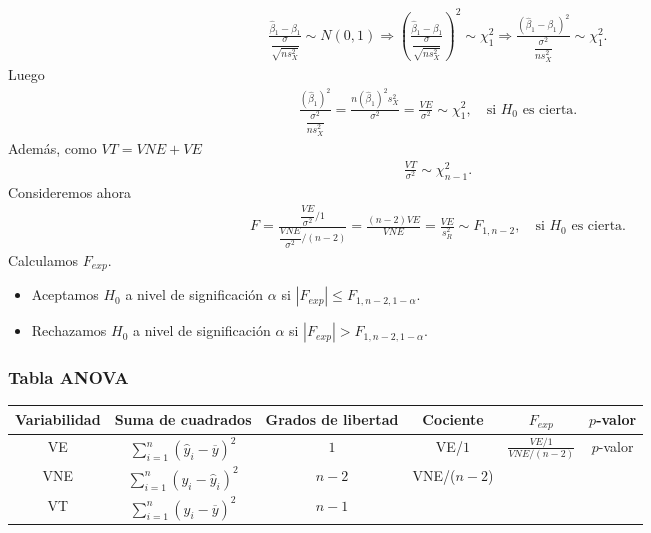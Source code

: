 \begin{enumerate}
\begin{align*}
    \frac{\widehat{\beta}_1 - \beta_1}{\dfrac{\sigma}{\sqrt{ns_X^2}}} \sim N(0,1) \Longrightarrow \left(\frac{\widehat{\beta}_1 - \beta_1}{\dfrac{\sigma}{\sqrt{ns_X^2}}} \right)^2 \sim \chi_1^2 \Longrightarrow \frac{(\widehat{\beta}_1 - \beta_1)^2}{\dfrac{\sigma^2}{ns_X^2}} \sim \chi^2_1.
\end{align*}
Luego
\begin{align*}
    \frac{(\widehat{\beta}_1)^2}{\dfrac{\sigma^2}{ns_X^2}} = \frac{n(\widehat{\beta}_1)^2s_X^2}{\sigma^2} = \frac{VE}{\sigma^2} \sim \chi^2_1, \quad \text{si $H_0$ es cierta}.
\end{align*}
Además, como $VT = VNE + VE$
\begin{align*}
    \frac{VT}{\sigma^2} \sim \chi_{n-1}^2.
\end{align*}
Consideremos ahora 
\begin{align*}
    F = \frac{\dfrac{VE}{\sigma^2}/1}{\dfrac{VNE}{\sigma^2}/(n-2)} = \frac{(n-2)VE}{VNE} = \frac{VE}{s_R^2} \sim F_{1,n-2}, \quad \text{si $H_0$ es cierta}.
\end{align*}
Calculamos $F_{exp}$.
\begin{itemize}
    \item Aceptamos $H_0$ a nivel de significación $\alpha$ si $|F_{exp}| \leq F_{1,n-2,1-\alpha}$.
    \item Rechazamos $H_0$ a nivel de significación $\alpha$ si $|F_{exp}| > F_{1,n-2,1-\alpha}$.
\end{itemize}
\end{enumerate}
\subsubsection{Tabla ANOVA}
\begin{center}
\begin{tabular}{|c|c|c|c|c|c|}
\hline
Variabilidad & Suma de cuadrados                               & Grados de libertad & Cociente & $F_{exp}$                    & $p$-valor \\  \hline
VE                     & $\sum_{i=1}^{n} (\widehat{y}_i - \overline{y})^2$ & $1$                  & VE/$1$     & $\frac{VE/1}{VNE/(n-2)}$ & $p$-valor   \\ [2ex]
VNE & $\sum_{i=1}^{n} (y_i - \widehat{y}_i)^2$ & $n-2$ & VNE/($n-2$) &  &  \\ [2ex]
VT  & $\sum_{i=1}^{n} (y_i -\overline{y})^2$   & $n-1$   &             &  &  \\ [2ex] \hline
\end{tabular}
\end{center}

